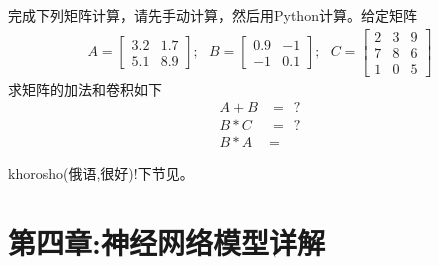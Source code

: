 \documentclass[12pt]{article}
\numberwithin{figure}{section}
\numberwithin{equation}{section}
\newenvironment{question}[2][Question]{\begin{trivlist}
\item[\hskip \labelsep {\bfseries #1}\hskip \labelsep {\bfseries #2.}]}{\end{trivlist}}
\begin{document}
\begin{question}{计算题 C3-Q4}
	完成下列矩阵计算，请先手动计算，然后用Python计算。给定矩阵
	\begin{align*}
		A = \begin{bmatrix}
			3.2 & 1.7 \\
			5.1 & 8.9 
		\end{bmatrix}; \ \ \ B = \begin{bmatrix}
			0.9 & -1 \\
			 -1 & 0.1 
		\end{bmatrix}; \ \ \ C = \begin{bmatrix}
			2 & 3 & 9 \\
			7 & 8 & 6 \\
			1 & 0 & 5 
		\end{bmatrix}
	\end{align*}
	求矩阵的加法和卷积如下
	\begin{align*}
		A + B & = \ \ ? \\
		B * C &= \ \ ? \\
		B * A & = 
	\end{align*}
\end{question}


\noindent
khorosho(俄语,很好)!下节见。



\newpage
\part*{第四章:神经网络模型详解}
\end{document}
